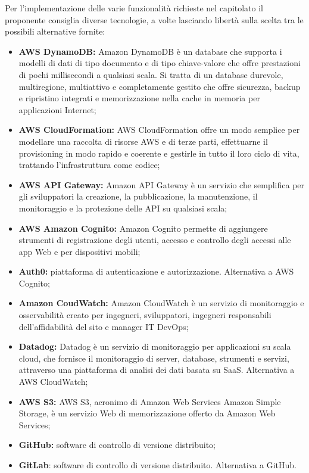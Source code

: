 Per l'implementazione delle varie funzionalità richieste nel capitolato il proponente consiglia diverse tecnologie, a volte lasciando libertà sulla scelta tra le possibili alternative fornite:
\begin{itemize}
    \item \textbf{AWS DynamoDB:} Amazon DynamoDB è un database che supporta i modelli di dati di tipo documento e di tipo chiave-valore che offre prestazioni di pochi millisecondi a qualsiasi scala. Si tratta di un database durevole, multiregione, multiattivo e completamente gestito che offre sicurezza, backup e ripristino integrati e memorizzazione nella cache in memoria per applicazioni Internet;
    \item \textbf{AWS CloudFormation:} AWS CloudFormation offre un modo semplice per modellare una raccolta di risorse AWS e di terze parti, effettuarne il provisioning in modo rapido e coerente e gestirle in tutto il loro ciclo di vita, trattando l'infrastruttura come codice;
    \item \textbf{AWS API Gateway:} Amazon API Gateway è un servizio che semplifica per gli sviluppatori la creazione, la pubblicazione, la manutenzione, il monitoraggio e la protezione delle API su qualsiasi scala;
    \item \textbf{AWS Amazon Cognito:} Amazon Cognito permette di aggiungere strumenti di registrazione degli utenti, accesso e controllo degli accessi alle app Web e per dispositivi mobili;
    \item \textbf{Auth0:} piattaforma di autenticazione e autorizzazione. Alternativa a AWS Cognito;
    \item \textbf{Amazon CoudWatch:} Amazon CloudWatch è un servizio di monitoraggio e osservabilità creato per ingegneri, sviluppatori, ingegneri responsabili dell'affidabilità del sito e manager IT DevOps;
    \item \textbf{Datadog:} Datadog è un servizio di monitoraggio per applicazioni su scala cloud, che fornisce il monitoraggio di server, database, strumenti e servizi, attraverso una piattaforma di analisi dei dati basata su SaaS. Alternativa a AWS CloudWatch;
    \item \textbf{AWS S3:} AWS S3, acronimo di Amazon Web Services Amazon Simple Storage, è un servizio Web di memorizzazione offerto da Amazon Web Services;
    \item \textbf{GitHub:} software di controllo di versione distribuito;
    \item \textbf{GitLab}: software di controllo di versione distribuito. Alternativa a GitHub.
\end{itemize}
